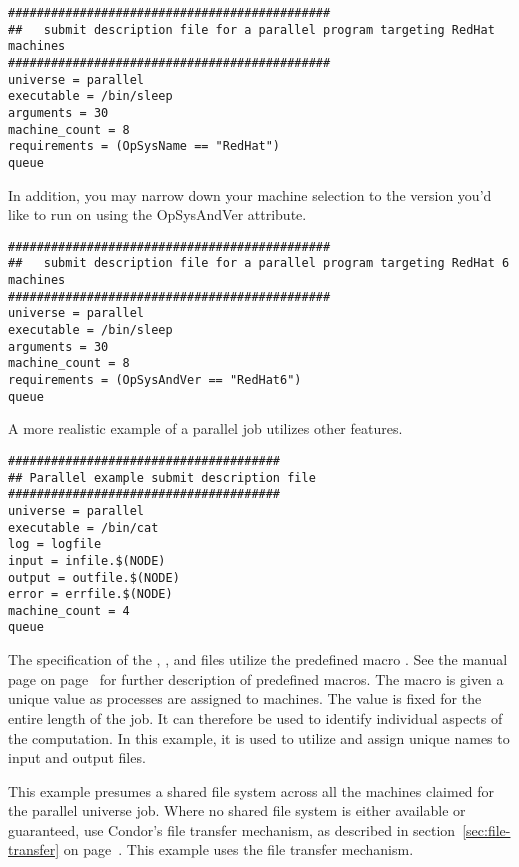 \begin{verbatim}
#############################################
##   submit description file for a parallel program targeting RedHat machines
#############################################
universe = parallel
executable = /bin/sleep
arguments = 30
machine_count = 8
requirements = (OpSysName == "RedHat")
queue
\end{verbatim}


In addition, you may narrow down your machine selection to the version you'd like to run on using the OpSysAndVer attribute.

\begin{verbatim}
#############################################
##   submit description file for a parallel program targeting RedHat 6 machines
#############################################
universe = parallel
executable = /bin/sleep
arguments = 30
machine_count = 8
requirements = (OpSysAndVer == "RedHat6")
queue
\end{verbatim}

A more realistic example of a parallel job utilizes other features.

\begin{verbatim}
######################################
## Parallel example submit description file
######################################
universe = parallel
executable = /bin/cat
log = logfile
input = infile.$(NODE)
output = outfile.$(NODE)
error = errfile.$(NODE)
machine_count = 4
queue
\end{verbatim}

The specification of the , ,
and  files utilize the predefined macro 
.
See the 
manual page on page~\pageref{man-condor-submit} for further
description of predefined macros.
The  macro is given a
unique value as processes are assigned to machines.
The  value is fixed for the entire length of the job.
It can therefore be used to identify individual aspects of the computation.
In this example, it is used to utilize and assign unique names to
input and output files.

This example presumes a shared file system across all the machines
claimed for the parallel universe job. 
Where no shared file system is either available or guaranteed,
use Condor's file transfer mechanism,
as described in section~\ref{sec:file-transfer}
on page~\pageref{sec:file-transfer}.
This example uses the file transfer mechanism.


